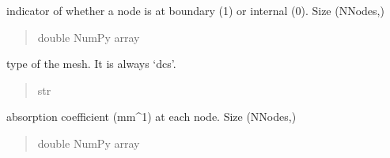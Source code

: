 \documentclass[letterpaper,10pt,english]{sphinxmanual}
\begin{document}
\begin{fulllineitems}
\begin{fulllineitems}
\label{\detokenize{_autosummary/nirfasterff.base.dcs_mesh.dcsmesh:nirfasterff.base.dcs_mesh.dcsmesh.bndvtx}}
\pysigstartsignatures
{}
\pysigstopsignatures
\sphinxAtStartPar
indicator of whether a node is at boundary (1) or internal (0). Size (NNodes,)
\begin{quote}\begin{description}
\sphinxAtStartPar
double NumPy array

\end{description}\end{quote}

\end{fulllineitems}


\begin{fulllineitems}
\label{\detokenize{_autosummary/nirfasterff.base.dcs_mesh.dcsmesh:nirfasterff.base.dcs_mesh.dcsmesh.type}}
\pysigstartsignatures
{}
\pysigstopsignatures
\sphinxAtStartPar
type of the mesh. It is always ‘dcs’.
\begin{quote}\begin{description}
\sphinxAtStartPar
str

\end{description}\end{quote}

\end{fulllineitems}


\begin{fulllineitems}
\label{\detokenize{_autosummary/nirfasterff.base.dcs_mesh.dcsmesh:nirfasterff.base.dcs_mesh.dcsmesh.mua}}
\pysigstartsignatures
{}
\pysigstopsignatures
\sphinxAtStartPar
absorption coefficient (mm\textasciicircum{}\sphinxhyphen{}1) at each node. Size (NNodes,)
\begin{quote}\begin{description}
\sphinxAtStartPar
double NumPy array

\end{description}\end{quote}


\end{fulllineitems}
\end{fulllineitems}
\end{document}
